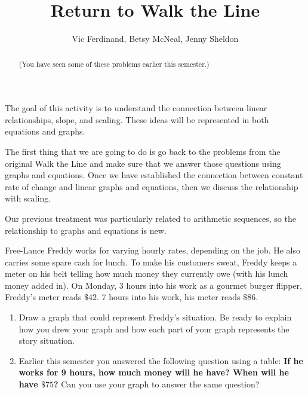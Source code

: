 \documentclass{ximera}
\title{Return to Walk the Line}
\author{Vic Ferdinand, Betsy McNeal, Jenny Sheldon}
\begin{document}
\begin{abstract}
 (You have seen some of these problems earlier this semester.)
\end{abstract}
\maketitle

\begin{instructorIntro}
The goal of this activity is to understand the connection between linear relationships, slope, and scaling.  These ideas will be represented in both equations and graphs.  

The first thing that we are going to do is go back to the problems from the original Walk the Line and make sure that we answer those questions using graphs and equations. Once we have established the connection between constant rate of change and linear graphs and equations, then we discuss the relationship with scaling.

Our previous treatment was particularly related to arithmetic sequences, so the relationship to graphs and equations is new. 

\end{instructorIntro}

\begin{problem}
 Free-Lance Freddy works for varying hourly rates, depending on the
job.  He also carries some spare cash for lunch.  To make his
customers sweat, Freddy keeps a meter on his belt telling how much
money they currently owe (with his lunch money added in).  On Monday, 3 hours into his work as a gourmet burger flipper,
  Freddy's meter reads $\$42$. 7 hours into his work, his meter reads
  $\$86$.  
  \begin{enumerate}
  \item Draw a graph that could represent Freddy's situation. Be ready to explain how you drew your graph and how each part of your graph represents the story situation.
  \item Earlier this semester you answered the following question using a table:  {\bf If he works for 9 hours, how much money will he have?  When
  will he have $\$75$?}  Can you use your graph to answer the same question?
  \end{enumerate}
\end{problem}
\end{document}
